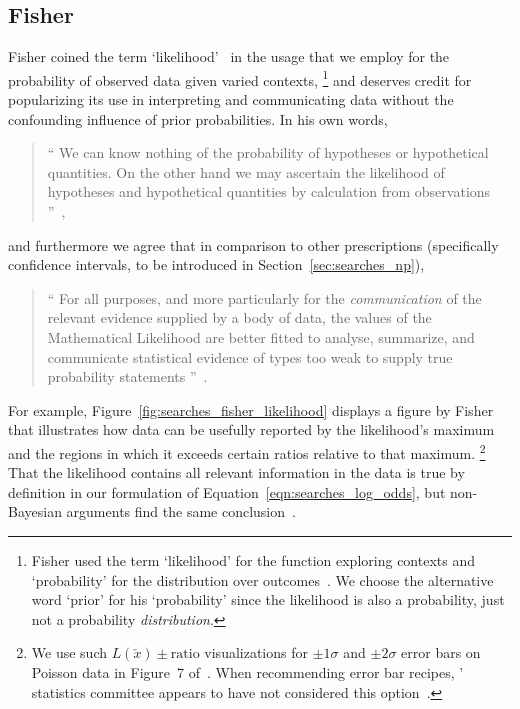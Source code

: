 \subsection{Fisher}
\label{sec:searches_fisher}
Fisher coined the term `likelihood'~\cite{
fisher1912fitting,
fisher1915frequency,
fisher1921probable,
fisher1922estimators
} in the usage that
we employ for the probability of observed data given varied
contexts,%
\footnote{%
Fisher used the term `likelihood' for the function exploring
contexts and `probability' for the distribution over
outcomes~\cite{fisher1925smrw}.
We choose the alternative word `prior' for his `probability' since the
likelihood is also a probability, just not a probability \emph{distribution}.
}
and deserves credit for popularizing its use in interpreting and communicating
data without the confounding influence of prior probabilities.
In his own words,%
\begin{quote}
\small
``%
We can know nothing of the probability of hypotheses or hypothetical
quantities.
On the other hand we may ascertain the likelihood of hypotheses
and hypothetical quantities by calculation from observations%
''~\cite{fisher1921probable},
\end{quote}
and furthermore we agree that in comparison to other prescriptions
(specifically confidence intervals, to be introduced in
Section~\ref{sec:searches_np}),
\begin{quote}
\small
``%
For all purposes, and more particularly for the \textit{communication} of the
relevant evidence supplied by a body of data, the values of the Mathematical
Likelihood are better fitted to analyse, summarize, and communicate
statistical evidence of types too weak to supply true probability statements%
''~\cite{fisher1956statistical}.
\end{quote}
For example, Figure~\ref{fig:searches_fisher_likelihood} displays a figure by
Fisher~\cite{fisher1956statistical} that illustrates how data can be usefully
reported by the likelihood's maximum and the regions in which it exceeds
certain ratios relative to that maximum.%
\footnote{%
We use such $L(\check{x})\pm\mathrm{ratio}$ visualizations for
$\pm1\sigma$ and $\pm2\sigma$ error bars on Poisson data in
Figure~7 of~\cite{lester2022hunting}.
When recommending error bar recipes, \atlas' statistics committee appears
to have not considered this option~\cite{cowan2011errorbars}.
}
That the likelihood contains all relevant information in the data is true by
definition in our formulation of Equation~\ref{eqn:searches_log_odds},
but non-Bayesian arguments find the same conclusion~\cite{
birnbaum1962foundations,
savage1962foundations
}.

